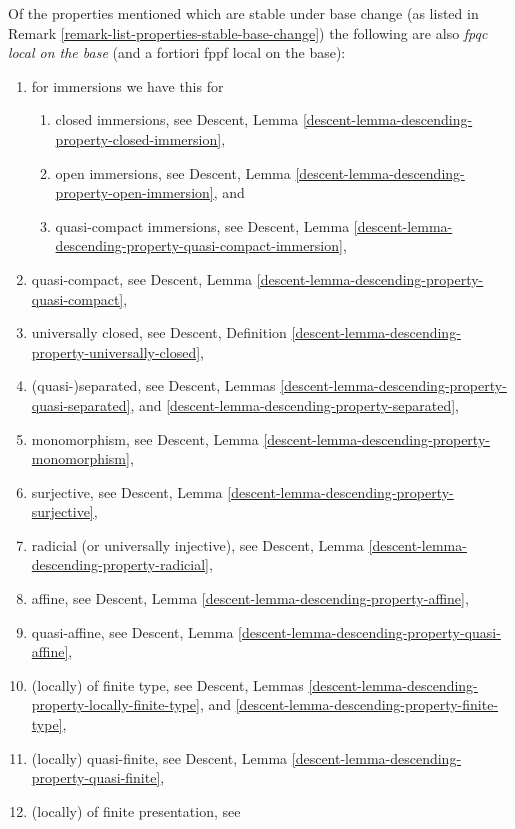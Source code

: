 \begin{remark}
\label{remark-list-properties-fpqc-local-base}
Of the properties mentioned which are stable under base change
(as listed in Remark \ref{remark-list-properties-stable-base-change})
the following are also {\it fpqc local on the base}
(and a fortiori fppf local on the base):
\begin{enumerate}
\item for immersions we have this for
\begin{enumerate}
\item closed immersions, see
Descent, Lemma \ref{descent-lemma-descending-property-closed-immersion},
\item open immersions, see
Descent, Lemma \ref{descent-lemma-descending-property-open-immersion}, and
\item quasi-compact immersions, see
Descent,
Lemma \ref{descent-lemma-descending-property-quasi-compact-immersion},
\end{enumerate}
\item quasi-compact, see
Descent, Lemma \ref{descent-lemma-descending-property-quasi-compact},
\item universally closed, see
Descent,
Definition \ref{descent-lemma-descending-property-universally-closed},
\item (quasi-)separated, see
Descent, Lemmas
\ref{descent-lemma-descending-property-quasi-separated}, and
\ref{descent-lemma-descending-property-separated},
\item monomorphism, see
Descent, Lemma \ref{descent-lemma-descending-property-monomorphism},
\item surjective, see
Descent, Lemma \ref{descent-lemma-descending-property-surjective},
\item radicial (or universally injective), see
Descent, Lemma \ref{descent-lemma-descending-property-radicial},
\item affine, see
Descent, Lemma \ref{descent-lemma-descending-property-affine},
\item quasi-affine, see
Descent, Lemma \ref{descent-lemma-descending-property-quasi-affine},
\item (locally) of finite type, see
Descent,
Lemmas \ref{descent-lemma-descending-property-locally-finite-type}, and
\ref{descent-lemma-descending-property-finite-type},
\item (locally) quasi-finite, see
Descent, Lemma \ref{descent-lemma-descending-property-quasi-finite},
\item (locally) of finite presentation, see

\end{enumerate}
\end{remark}
